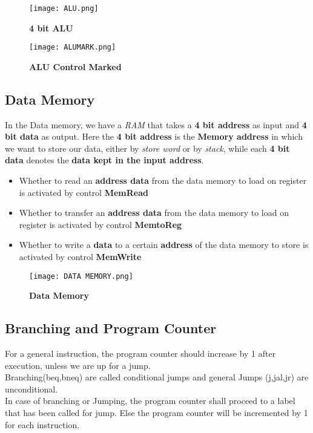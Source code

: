 \documentclass[12pt]{article}
\begin{document}
    
    \begin{figure}[H]
        \centering
        \texttt{[image: ALU.png]}
        \caption{\textbf{4 bit ALU}}
        \label{fig:17}
    \end{figure}

    \begin{figure}[H]
        \centering
        \texttt{[image: ALUMARK.png]}
        \caption{\textbf{ALU Control Marked}}
        \label{fig:18}
    \end{figure}

    
\subsection{Data Memory}
    In the Data memory, we have a \textit{RAM} that takes a \textbf{4 bit address} as input and \textbf{4 bit data} as output. Here the 
    \textbf{4 bit address} is the \textbf{Memory address} in which we want to store our data, either by \textit{store word} or by \textit{stack}, while each \textbf{4 bit data } denotes the \textbf{data kept in the input address}.\\
    \begin{itemize}
        \item Whether to read an \textbf{address data} from the data memory to load on register is activated by control \textbf{MemRead}
        \item Whether to transfer an \textbf{address data} from the data memory to load on register is activated by control \textbf{MemtoReg}
        \item Whether to write a \textbf{data} to a certain \textbf{address} of the data memory to store is activated by control \textbf{MemWrite}\\
    \end{itemize}

    \begin{figure}[H]
        \centering
        \texttt{[image: DATA MEMORY.png]}
        \caption{\textbf{Data Memory}}
        \label{fig:19}
    \end{figure}
\subsection{Branching and Program Counter}

    For a general instruction, the program counter should increase by 1 after execution, unless we are up for a jump.\\
    Branching(beq,bneq) are called conditional jumps and general Jumps (j,jal,jr) are unconditional.\\
    In case of branching or Jumping, the program counter shall proceed to a label that has been called for jump. Else the program counter will be incremented by 1 for each instruction.\\ \\
    
\end{document}
